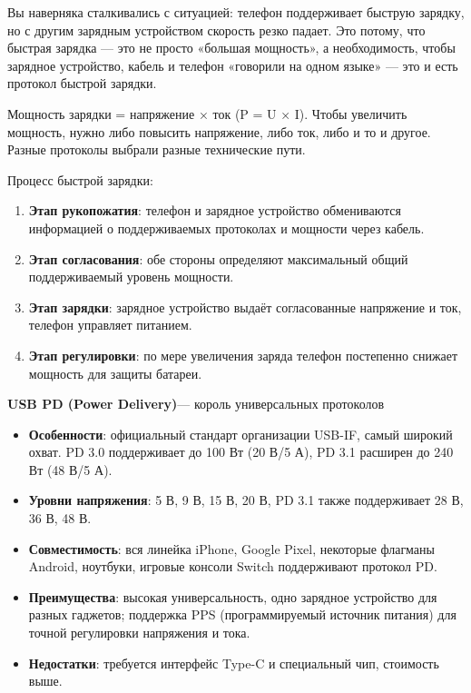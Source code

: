 
Вы наверняка сталкивались с ситуацией: телефон поддерживает быструю зарядку, но с другим зарядным устройством скорость резко падает. Это потому, что быстрая зарядка — это не просто «большая мощность», а необходимость, чтобы зарядное устройство, кабель и телефон «говорили на одном языке» — это и есть протокол быстрой зарядки.


Мощность зарядки = напряжение × ток (P = U × I). Чтобы увеличить мощность, нужно либо повысить напряжение, либо ток, либо и то и другое. Разные протоколы выбрали разные технические пути.

Процесс быстрой зарядки:

\begin{enumerate}
  \item \textbf{Этап рукопожатия}: телефон и зарядное устройство обмениваются информацией о поддерживаемых протоколах и мощности через кабель.
  \item \textbf{Этап согласования}: обе стороны определяют максимальный общий поддерживаемый уровень мощности.
  \item \textbf{Этап зарядки}: зарядное устройство выдаёт согласованные напряжение и ток, телефон управляет питанием.
  \item \textbf{Этап регулировки}: по мере увеличения заряда телефон постепенно снижает мощность для защиты батареи.
\end{enumerate}


\textbf{USB PD (Power Delivery)}— король универсальных протоколов

\begin{itemize}
  \item \textbf{Особенности}: официальный стандарт организации USB-IF, самый широкий охват. PD 3.0 поддерживает до 100 Вт (20 В/5 А), PD 3.1 расширен до 240 Вт (48 В/5 А).
  \item \textbf{Уровни напряжения}: 5 В, 9 В, 15 В, 20 В, PD 3.1 также поддерживает 28 В, 36 В, 48 В.
  \item \textbf{Совместимость}: вся линейка iPhone, Google Pixel, некоторые флагманы Android, ноутбуки, игровые консоли Switch поддерживают протокол PD.
  \item \textbf{Преимущества}: высокая универсальность, одно зарядное устройство для разных гаджетов; поддержка PPS (программируемый источник питания) для точной регулировки напряжения и тока.
  \item \textbf{Недостатки}: требуется интерфейс Type-C и специальный чип, стоимость выше.
\end{itemize}

